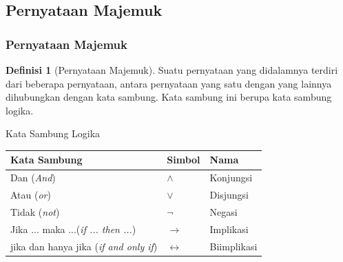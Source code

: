 \documentclass[handout]{beamer}
\theoremstyle{definition}
\newtheorem{definisi}[theorem]{Definisi}
\theoremstyle{example}
\begin{document}
\subsection{Pernyataan Majemuk}
\begin{frame}
\frametitle{Pernyataan Majemuk}
  \begin{definisi}[Pernyataan Majemuk]
   Suatu pernyataan yang didalamnya terdiri dari beberapa pernyataan, antara pernyataan yang satu dengan yang lainnya dihubungkan dengan kata sambung. Kata sambung ini berupa kata sambung logika.
  \end{definisi}
  
  \begin{block}{Kata Sambung Logika}
  	\begin{tabular}{ | l | l | l | }
  		\hline
  		Kata Sambung & Simbol & Nama \\ \hline
  		Dan (\textit{And}) & $\wedge$ & Konjungsi \\ \hline
  		Atau (\textit{or}) & $\vee$ & Disjungsi \\ \hline
  		Tidak (\textit{not}) & $\neg$ & Negasi \\ \hline
  		Jika ... maka ...(\textit{if ... then ...}) & $\rightarrow$ & Implikasi \\ \hline
  		jika dan hanya jika (\textit{if and only if}) & $\leftrightarrow$ & Biimplikasi \\ 
  		\hline
  	\end{tabular}
  \end{block}
  
  
\end{frame}
\end{document}
